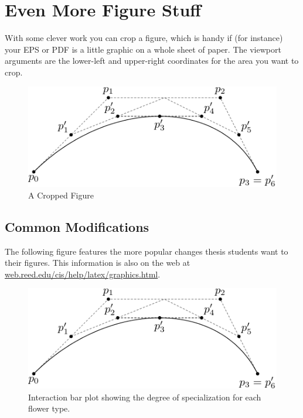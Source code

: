 \documentclass[12pt,twoside]{reedthesis}
\begin{document}
\section{Even More Figure Stuff}
With some clever work you can crop a figure, which is handy if (for instance) your EPS or PDF is a little graphic on a whole sheet of paper. The viewport arguments are the lower-left and upper-right coordinates for the area you want to crop.

 	\begin{figure}[h!]
	    	       \centering
	   \includegraphics[clip=true, viewport=.0in .0in 1in 1in]{subdivision}
	    \caption{A Cropped Figure}
	 \label{subd3}
	\end{figure}
	
      \subsection{Common Modifications}
      The following figure features the more popular changes thesis students want to their figures. This information is also on the web at \url{web.reed.edu/cis/help/latex/graphics.html}.
           \renewcommand{\thefigure}{0.\arabic{figure}} %
    \addtocounter{figure}{4} %
    \begin{figure}[htbp]
    \begin{center}
   \includegraphics[scale=0.5]{subdivision}
    \caption[Flower type and percent specialization]{\footnotesize{Interaction bar plot showing the degree of specialization for each flower type.}} %
    \label{barplot}
    \end{center}
    \end{figure} 
%
\end{document}
